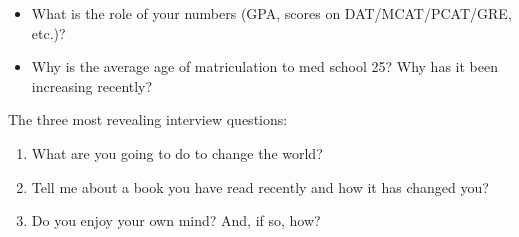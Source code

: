 \begin{noheadline}
\begin{frame}[t]
    \begin{adjustwidth}{-1.5em}{-1.5em}
        \begin{itemize}
            \item What is the role of your numbers (GPA, scores on
                DAT/MCAT/PCAT/GRE, etc.)?


            \vspace{2cm}
            \item Why is the average age of matriculation to med school 25? Why
                has it been increasing recently?

        \end{itemize}
    \end{adjustwidth}
\end{frame}
\end{noheadline}

\begin{noheadline}
\begin{frame}[t]
    \begin{adjustwidth}{-1.5em}{-1.5em}
       The three most revealing interview questions:

       \begin{enumerate}
           \item What are you going to do to change the world?


               \vspace{1cm}
           \item Tell me about a book you have read recently and how it has
               changed you?


               \vspace{1cm}
           \item Do you enjoy your own mind? And, if so, how?

       \end{enumerate}  
    \end{adjustwidth}
\end{frame}
\end{noheadline}

